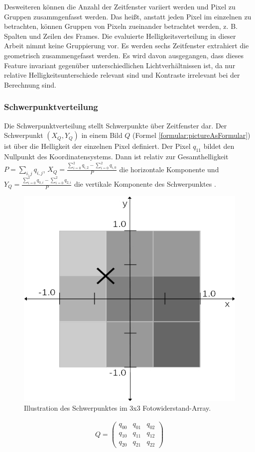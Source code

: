 Desweiteren können die Anzahl der Zeitfenster variiert werden und Pixel zu Gruppen zusammgenfasst werden. Das heißt, anstatt jeden Pixel im einzelnen zu betrachten, können Gruppen von Pixeln zueinander
betrachtet werden, z. B. Spalten und Zeilen des Frames. Die evaluierte Helligkeitsverteilung in dieser Arbeit nimmt keine Gruppierung vor. Es werden sechs Zeitfenster extrahiert die geometrisch zusammengefasst
werden.
\newline
\newline
Es wird davon ausgegangen, dass dieses Feature invariant gegenüber unterschiedlichen Lichtverhältnissen ist, da nur relative Helligkeitsunterschiede relevant sind und Kontraste irrelevant bei der
Berechnung sind.

\subsubsection{Schwerpunktverteilung}
\label{sec:schwerpunktverteilung}
Die Schwerpunktverteilung stellt Schwerpunkte über Zeitfenster dar. Der Schwerpunkt $(X_Q, Y_Q)$ in einem Bild $Q$ (Formel \ref{formular:pictureAsFormular}) ist über die Helligkeit der einzelnen
Pixel definiert. Der Pixel $q_{11}$ bildet den Nullpunkt des Koordinatensystems. Dann ist relativ zur Gesamthelligkeit $P = \sum_{i,j} q_{i,j}$, $X_Q=\frac{\sum_{i=0}^{2} q_{i,2} - \sum_{i=0}^{2} q_{i,0}}{P}$
die horizontale Komponente und $Y_Q = \frac{\sum_{i=0}^{2} q_{0,i} - \sum_{i=0}^{2} q_{2,i}}{P}$ die vertikale Komponente des Schwerpunktes \cite{schwerpunktAnsatz}.
\begin{figure}
    \centering
    \includegraphics[width=0.5\linewidth]{images/schwerpunkt_ansatz.jpg}
    \caption{Illustration des Schwerpunktes im 3x3 Fotowiderstand-Array.}
    \label{fig:schwerpunkt}
\end{figure}
\begin{align}
    Q = \begin{pmatrix}
            q_{00} & q_{01} & q_{02} \\
            q_{10} & q_{11} & q_{12} \\
            q_{20} & q_{21} & q_{22}
    \end{pmatrix}
    \label{formular:pictureAsFormular}
\end{align}
